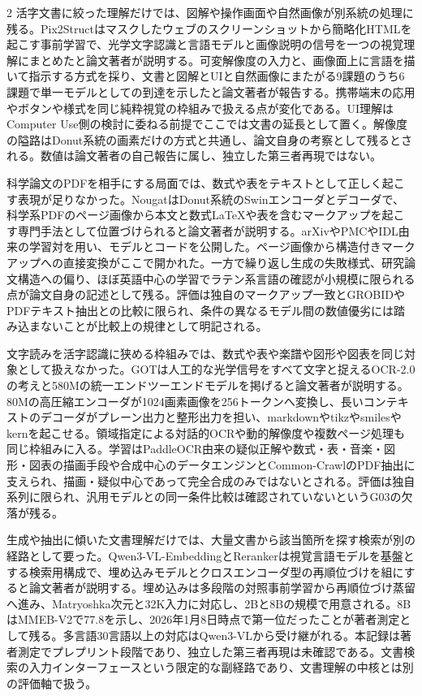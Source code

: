 \documentclass[lualatex,a4paper,10pt]{jlreq}
\begin{document}
\begin{multicols}{2}
\noindent 活字文書に絞った理解だけでは、図解や操作画面や自然画像が別系統の処理に残る。Pix2Structはマスクしたウェブのスクリーンショットから簡略化HTMLを起こす事前学習で、光学文字認識と言語モデルと画像説明の信号を一つの視覚理解にまとめたと論文著者が説明する。可変解像度の入力と、画像面上に言語を描いて指示する方式を採り、文書と図解とUIと自然画像にまたがる9課題のうち6課題で単一モデルとしての到達を示したと論文著者が報告する。携帯端末の応用やボタンや様式を同じ純粋視覚の枠組みで扱える点が変化である。UI理解はComputer Use側の検討に委ねる前提でここでは文書の延長として置く。解像度の隘路はDonut系統の画素だけの方式と共通し、論文自身の考察として残るとされる。数値は論文著者の自己報告に属し、独立した第三者再現ではない。\autocite{vmd026}\par\medskip
\noindent 科学論文のPDFを相手にする局面では、数式や表をテキストとして正しく起こす表現が足りなかった。NougatはDonut系統のSwinエンコーダとデコーダで、科学系PDFのページ画像から本文と数式LaTeXや表を含むマークアップを起こす専門手法として位置づけられると論文著者が説明する。arXivやPMCやIDL由来の学習対を用い、モデルとコードを公開した。ページ画像から構造付きマークアップへの直接変換がここで開かれた。一方で繰り返し生成の失敗様式、研究論文構造への偏り、ほぼ英語中心の学習でラテン系言語の確認が小規模に限られる点が論文自身の記述として残る。評価は独自のマークアップ一致とGROBIDやPDFテキスト抽出との比較に限られ、条件の異なるモデル間の数値優劣には踏み込まないことが比較上の規律として明記される。\autocite{vmd027}\par\medskip
\noindent 文字読みを活字認識に狭める枠組みでは、数式や表や楽譜や図形や図表を同じ対象として扱えなかった。GOTは人工的な光学信号をすべて文字と捉えるOCR-2.0の考えと580Mの統一エンドツーエンドモデルを掲げると論文著者が説明する。80Mの高圧縮エンコーダが1024画素画像を256トークンへ変換し、長いコンテキストのデコーダがプレーン出力と整形出力を担い、markdownやtikzやsmilesやkernを起こせる。領域指定による対話的OCRや動的解像度や複数ページ処理も同じ枠組みに入る。学習はPaddleOCR由来の疑似正解や数式・表・音楽・図形・図表の描画手段や合成中心のデータエンジンとCommon-CrawlのPDF抽出に支えられ、描画・疑似中心であって完全合成のみではないとされる。評価は独自系列に限られ、汎用モデルとの同一条件比較は確認されていないというG03の欠落が残る。\autocite{vmd028}\par\medskip
\noindent 生成や抽出に傾いた文書理解だけでは、大量文書から該当箇所を探す検索が別の経路として要った。Qwen3-VL-EmbeddingとRerankerは視覚言語モデルを基盤とする検索用構成で、埋め込みモデルとクロスエンコーダ型の再順位づけを組にすると論文著者が説明する。埋め込みは多段階の対照事前学習から再順位づけ蒸留へ進み、Matryoshka次元と32K入力に対応し、2Bと8Bの規模で用意される。8BはMMEB-V2で77.8を示し、2026年1月8日時点で第一位だったことが著者測定として残る。多言語30言語以上の対応はQwen3-VLから受け継がれる。本記録は著者測定でプレプリント段階であり、独立した第三者再現は未確認である。文書検索の入力インターフェースという限定的な副経路であり、文書理解の中核とは別の評価軸で扱う。\autocite{vmd029}\par\medskip

\end{multicols}
\end{document}

